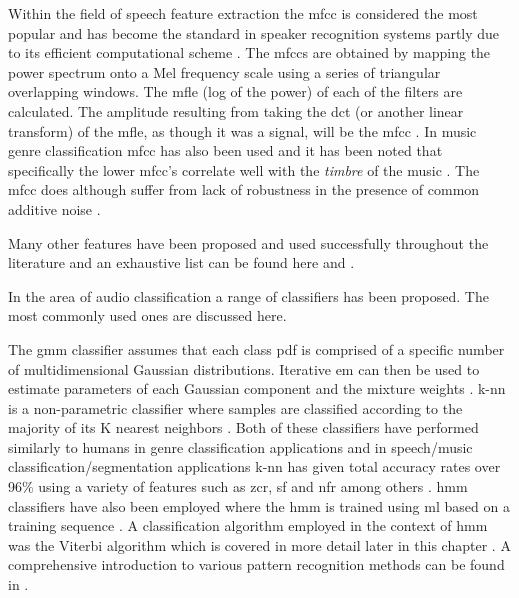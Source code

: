 \label{corrections:mfcc1}
Within the field of speech feature extraction the \gls{mfcc} is considered the most popular and has become the standard in speaker recognition systems partly due to its efficient computational scheme \cite{Tyagi2005}. The \gls{mfcc}s are obtained by mapping the power spectrum onto a Mel frequency scale using a series of triangular overlapping windows. The \gls{mfle} (log of the power) of each of the filters are calculated. The amplitude resulting from taking the \gls{dct} (or another linear transform) of the \gls{mfle}, as though it was a signal, will be the \gls{mfcc} \cite{Sahidullah2012}. In music genre classification \gls{mfcc} has also been used and it has been noted that specifically the lower \gls{mfcc}'s correlate well with the \emph{timbre} of the music \cite{Muller2010}. The \gls{mfcc} does although suffer from lack of robustness in the presence of common additive noise \cite{Tyagi2005}.

Many other features have been proposed and used successfully throughout the literature and an exhaustive list can be found here \cite{Scheirer1997} and \cite{Gouyon2000}.



In the area of audio classification a range of classifiers has been proposed. The most commonly used ones are discussed here.

The \gls{gmm} classifier assumes that each class pdf is comprised of a specific number of multidimensional Gaussian distributions. Iterative \gls{em} can then be used to estimate parameters of each Gaussian component and the mixture weights \cite{Tzanetakis2002}. \gls{k-nn} is a non-parametric classifier where samples are classified according to the majority of its K nearest neighbors \cite{Lu2001}. Both of these classifiers have performed similarly to humans in genre classification applications \cite{Tzanetakis2002} and in speech/music classification/segmentation applications \gls{k-nn} has given total accuracy rates over 96\% using a variety of features such as \gls{zcr}, \gls{sf} and \gls{nfr} among others \cite{Lu2002}. \gls{hmm} classifiers have also been employed where the \gls{hmm} is trained using \gls{ml} based on a training sequence \cite{Kimber1997}\cite{Xiong2003}\cite{Burke2013}. A classification algorithm employed in the context of \gls{hmm} was the Viterbi algorithm which is covered in more detail later in this chapter \cite{Kimber1997}\cite{Burke2013}.
A comprehensive introduction to various pattern recognition methods can be found in \cite{Duda2001}.

